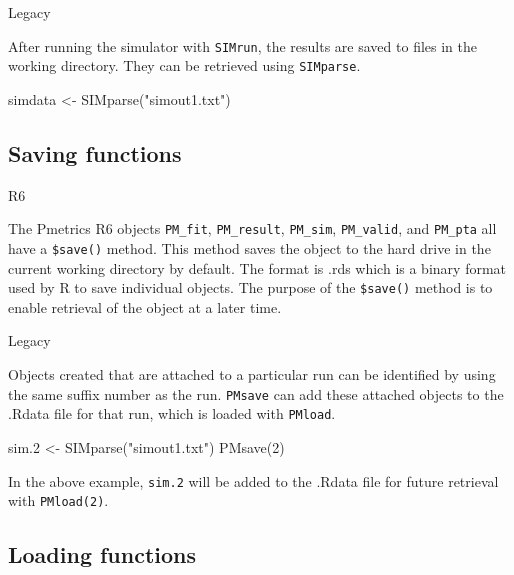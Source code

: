 \documentclass[
]{book}
\newenvironment{Shaded}{\begin{snugshade}}{\end{snugshade}}
\newcommand{\DecValTok}[1]{\textcolor[rgb]{0.00,0.00,0.81}{#1}}
\newcommand{\FloatTok}[1]{\textcolor[rgb]{0.00,0.00,0.81}{#1}}
\newcommand{\FunctionTok}[1]{\textcolor[rgb]{0.00,0.00,0.00}{#1}}
\newcommand{\NormalTok}[1]{#1}
\newcommand{\OtherTok}[1]{\textcolor[rgb]{0.56,0.35,0.01}{#1}}
\newcommand{\StringTok}[1]{\textcolor[rgb]{0.31,0.60,0.02}{#1}}
\begin{document}
{Legacy}

After running the simulator with \texttt{SIMrun}, the results are saved to files
in the working
directory. They can be retrieved using \texttt{SIMparse}.

\begin{Shaded}
\begin{Highlighting}[]
\NormalTok{simdata }\OtherTok{\textless{}{-}} \FunctionTok{SIMparse}\NormalTok{(}\StringTok{"simout1.txt"}\NormalTok{)}
\end{Highlighting}
\end{Shaded}

\hypertarget{saving-functions}{%
\subsection{Saving functions}\label{saving-functions}}

{R6}

The Pmetrics R6 objects \texttt{PM\_fit}, \texttt{PM\_result}, \texttt{PM\_sim}, \texttt{PM\_valid}, and
\texttt{PM\_pta} all have a \texttt{\$save()} method. This method saves the object to the hard drive
in the current working directory by default. The format is .rds which is a
binary format used by R to save individual objects. The purpose of the \texttt{\$save()}
method is to enable retrieval of the object at a later time.

{Legacy}

Objects created that are attached to a particular run can be identified by using
the same suffix number as the run. \texttt{PMsave} can add these attached objects to
the .Rdata file for that run, which is loaded with \texttt{PMload}.

\begin{Shaded}
\begin{Highlighting}[]
\NormalTok{sim}\FloatTok{.2} \OtherTok{\textless{}{-}} \FunctionTok{SIMparse}\NormalTok{(}\StringTok{"simout1.txt"}\NormalTok{)}
\FunctionTok{PMsave}\NormalTok{(}\DecValTok{2}\NormalTok{)}
\end{Highlighting}
\end{Shaded}

In the above example, \texttt{sim.2} will be added to the .Rdata file for future
retrieval with \texttt{PMload(2)}.

\hypertarget{loading-functions}{%
\subsection{Loading functions}\label{loading-functions}}
\end{document}
